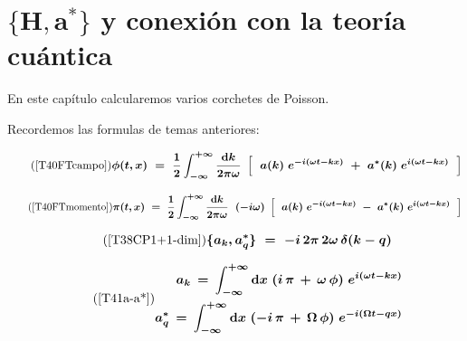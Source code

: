 \chapter{$\boldsymbol{\{H,a^*\}}$ y conexión con la teoría cuántica}
\label{T38}

\vspace{10mm}
\begin{adjustwidth}{50pt}{50pt}
\begin{ejemplo}
\vspace{2mm}
En este capítulo calcularemos varios corchetes de Poisson.

\vspace{2mm}

\end{ejemplo}
\end{adjustwidth}

\vspace{5mm}

Recordemos las formulas de temas anteriores:

	
\begin{equation}
\tag{\ref{T40FTcampo}}
\boldsymbol{ 
\phi(t,x) \ = \ \dfrac 1 2   \int_{-\infty}^{+\infty} 
\dfrac{\dd k}{2\pi \omega} \ \left[ \ 
\  a(k)\ e^{-i(\omega t-kx)} \ + \ a^*(k)\ e^{i(\omega t-kx)} \  \ \right]
} 	
\end{equation}

\begin{equation}
\tag{\ref{T40FTmomento}}
\boldsymbol{ 
 \pi(t,x)\ = \
\dfrac 1 2   \int_{-\infty}^{+\infty} 
\dfrac{\dd k}{2\pi \omega} \ \ (-i\omega) \ \left[ \ 
\  a(k)\ e^{-i(\omega t-kx)} \ - \ a^*(k)\ e^{i(\omega t-kx)} \ 
\ \right]
 }		
\end{equation}

\begin{equation}
\tag{\ref{T38CP1+1-dim}}
\boldsymbol{ \{a_k,a^*_q\} \ = \ -i\, 2\pi\, 2\omega\, \delta(k-q) } 	
\end{equation}



\begin{equation}
\tag{\ref{T41a-a*}}
\begin{split}
\boldsymbol{
a_k\, = \,  \int_{-\infty}^{+\infty} \dd x \ (i\, \pi\, + \, \omega\, \phi) \  e^{i(\omega t-kx)}  }
\\
\boldsymbol{
a^*_q\, = \,  \int_{-\infty}^{+\infty} \dd x \ (-i\, \pi\, + \, \Omega\, \phi) \  e^{-i(\Omega t-qx)}  }
\end{split}
\end{equation}


